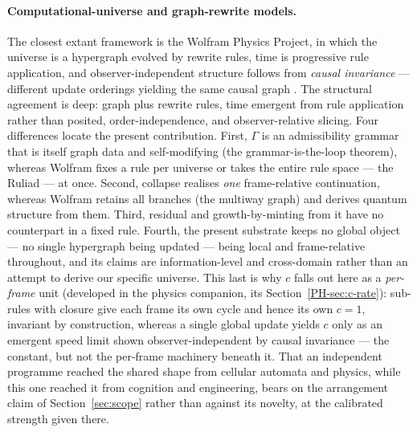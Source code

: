 \documentclass[11pt,a4paper]{article}
\theoremstyle{remark}\newtheorem{remark}[definition]{Remark}
\begin{document}
\paragraph{Computational-universe and graph-rewrite models.} The closest extant framework is the Wolfram Physics Project, in which the universe is a hypergraph evolved by rewrite rules, time is progressive rule application, and observer-independent structure follows from \emph{causal invariance} --- different update orderings yielding the same causal graph \citep{wolfram2002,wolfram2020,wolfram2020cs}. The structural agreement is deep: graph plus rewrite rules, time emergent from rule application rather than posited, order-independence, and observer-relative slicing. Four differences locate the present contribution. First, $\Gamma$ is an admissibility grammar that is itself graph data and self-modifying (the grammar-is-the-loop theorem), whereas Wolfram fixes a rule per universe or takes the entire rule space --- the Ruliad --- at once. Second, collapse realises \emph{one} frame-relative continuation, whereas Wolfram retains all branches (the multiway graph) and derives quantum structure from them. Third, residual and growth-by-minting from it have no counterpart in a fixed rule. Fourth, the present substrate keeps no global object --- no single hypergraph being updated --- being local and frame-relative throughout, and its claims are information-level and cross-domain rather than an attempt to derive our specific universe. This last is why $c$ falls out here as a \emph{per-frame} unit (developed in the physics companion, its Section~\ref{PH-sec:c-rate}): sub-rules with closure give each frame its own cycle and hence its own $c=1$, invariant by construction, whereas a single global update yields $c$ only as an emergent speed limit shown observer-independent by causal invariance --- the constant, but not the per-frame machinery beneath it. That an independent programme reached the shared shape from cellular automata and physics, while this one reached it from cognition and engineering, bears on the arrangement claim of Section~\ref{sec:scope} rather than against its novelty, at the calibrated strength given there.
\end{document}
